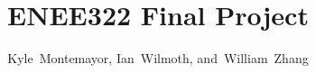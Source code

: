 \documentclass[journal]{IEEEtran}
\begin{document}
%
\title{ENEE322 Final Project}
%
%
%

\author{Kyle~Montemayor,
        Ian~Wilmoth,
        and~William~Zhang%
}

% 
%



% 




\end{document}
